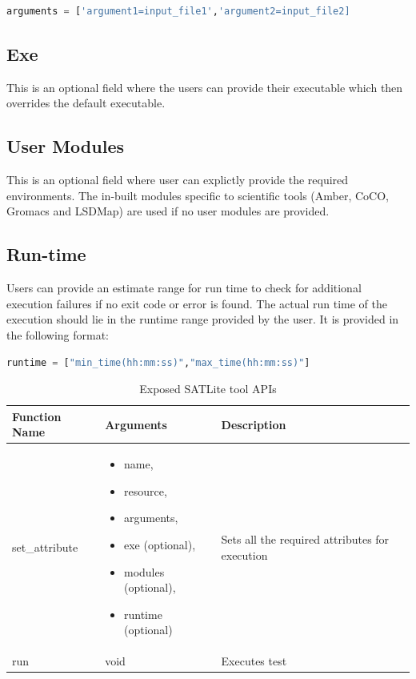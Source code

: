 \documentclass[10pt]{ruthesis}
\begin{document}
\begin{lstlisting}[language=Python,linewidth=13cm]
 arguments = ['argument1=input_file1','argument2=input_file2]
\end{lstlisting}

\subsection{Exe}
This is an optional field where the users can provide their executable which then overrides the default executable.

\subsection{User Modules}
This is an optional field where user can explictly provide the required environments. The in-built modules specific to scientific tools (Amber, CoCO, Gromacs and LSDMap) are used if no user modules are provided.

\subsection{Run-time}
Users can provide an estimate range for run time to check for additional execution failures if no exit code or error is found. The actual run time of the execution should lie in the runtime range provided by the user. It is provided in the following format:

\begin{lstlisting}[language=Python,linewidth=12cm]
 runtime = ["min_time(hh:mm:ss)","max_time(hh:mm:ss)"]
\end{lstlisting}

\begin{table}
\begin{center}
\def\arraystretch{1.5}
\begin{tabular}{|p{4cm}|p{5cm}|p{6cm}|}
\hline
\rule{0pt}{15pt} \textbf{Function Name} & \textbf{Arguments} & \textbf{Description} \\[2ex]
\hline
set\_attribute &
	\begin{itemize}
	\item name,
	\item resource,
	\item arguments,
	\item exe (optional),
	\item modules (optional),
	\item runtime (optional)
	\end{itemize} &
Sets all the required attributes for execution
\\
\hline
run &
void &
Executes test
\\
\hline
\end{tabular}
\end{center}
\caption{Exposed SATLite tool APIs}
\label{satapi}
\end{table}
\end{document}
